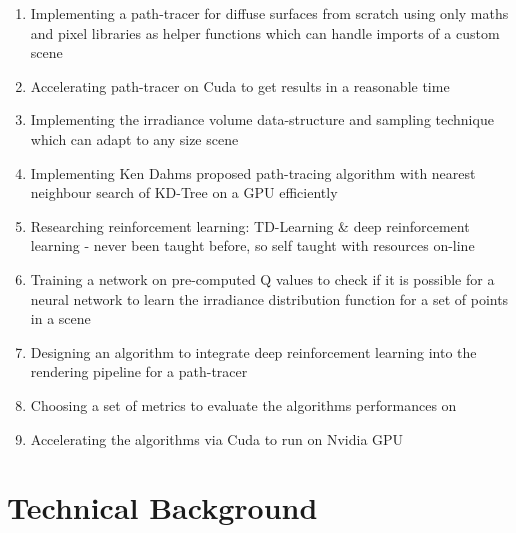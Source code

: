 \documentclass[ %
                    author={Callum Pearce},
                supervisor={Dr. Neill Campbell},
                    degree={MEng},
                     title={How effective are Temporal difference learning methods for reducing the number of zero contribution light paths while still accurately approximating Global Illumination in Path tracing?},
                  subtitle={},
                      type={research},
                      year={2019} ]{dissertation}
\begin{document}
\begin{enumerate}
\begin{enumerate}
\item Implementing a path-tracer for diffuse surfaces from scratch using only maths 
and pixel libraries as helper functions which can handle imports of a custom scene
\item Accelerating path-tracer on Cuda to get results in a reasonable time
\item Implementing the irradiance volume data-structure and sampling technique which 
can adapt to any size scene
\item Implementing Ken Dahms proposed path-tracing algorithm with nearest neighbour
 search of KD-Tree on a GPU efficiently 
\item Researching reinforcement learning: TD-Learning \& deep reinforcement learning - 
never been taught before, so self taught with resources on-line
\item Training a network on pre-computed Q values to check if it is possible for a neural
 network to learn the irradiance distribution function for a set of points in a scene
\item Designing an algorithm to integrate deep reinforcement learning into the 
rendering pipeline for a path-tracer
\item Choosing a set of metrics to evaluate the algorithms performances on
\item Accelerating the algorithms via Cuda to run on Nvidia GPU
\end{enumerate}

\end{enumerate}


\chapter{Technical Background}
\label{chap:technical}
\end{document}
